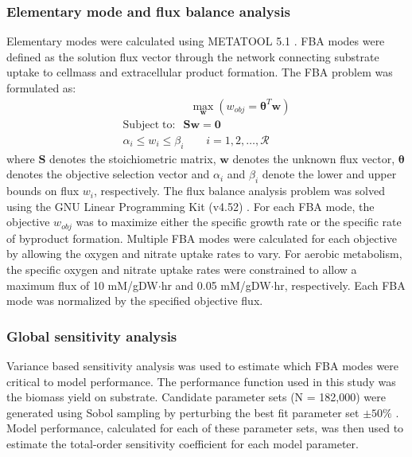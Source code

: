 \documentclass[10pt,twocolumn,twoside,final]{IEEEtran}
\begin{document}
\noindent\subsubsection*{Elementary mode and flux balance analysis}
Elementary modes were calculated using METATOOL 5.1 \cite{2006_vonKamp_Metatool}.
FBA modes were defined as the solution flux vector through the network connecting substrate uptake to cellmass and extracellular product formation.
The FBA problem was formulated as:
\begin{equation}
 \begin{multlined}
	\qquad \qquad \qquad \max_{\boldsymbol{w}}{} \! \left( w_{obj} = \mathbf{\boldsymbol{\theta}}^T \boldsymbol{w} \right) \\
	\mathrm{Subject \; to:}
	 \; \; \mathbf{S}\mathbf{w}=\mathbf{0} \\
\alpha_i \leq w_i \leq \beta_i  \qquad i=1,2,\hdots,\mathcal{R}
 \end{multlined}
\end{equation}
where $\mathbf{S}$ denotes the stoichiometric matrix, $\mathbf{w}$ denotes the unknown flux vector, $\boldsymbol{\theta}$ denotes the objective selection vector
and $\alpha_i$ and $\beta_i$ denote the lower and upper bounds on flux $w_{i}$, respectively.
The flux balance analysis problem was solved using the GNU Linear Programming Kit (v4.52) \cite{GLPK}.
For each FBA mode, the objective $w_{obj}$ was to maximize either the specific growth rate or the specific rate of byproduct formation.
Multiple FBA modes were calculated for each objective by allowing the oxygen and nitrate uptake rates to vary.
For aerobic metabolism, the specific oxygen and nitrate uptake rates were constrained to allow a maximum flux of 10 mM/gDW$\cdot$hr and 0.05 mM/gDW$\cdot$hr, respectively.
Each FBA mode was normalized by the specified objective flux.

\subsubsection*{Global sensitivity analysis}
Variance based sensitivity analysis was used to estimate which FBA modes were critical to model performance.
The performance function used in this study was the biomass yield on substrate.
Candidate parameter sets (N = 182,000) were generated using Sobol sampling by perturbing the best fit parameter set $\pm50\%$ \cite{SALib}.
Model performance, calculated for each of these parameter sets, was then used to estimate the total-order sensitivity coefficient for each model parameter.
\end{document}
